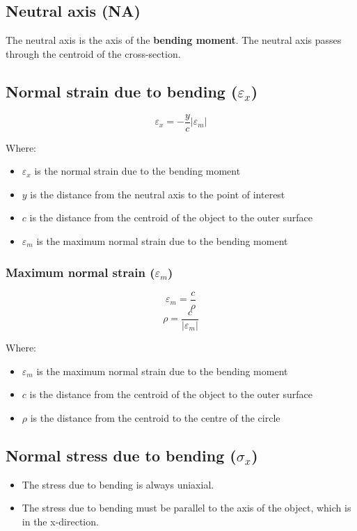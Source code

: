 \documentclass[11pt]{article}
\begin{document}
\subsection{Neutral axis (NA)}
\label{sec:org1c560bc}
The neutral axis is the axis of the \textbf{bending moment}. The neutral axis passes through the centroid of the cross-section.
\subsection{Normal strain due to bending (\(\varepsilon_x\))}
\label{sec:org7c1be3c}
\[\varepsilon_x = - \frac{y}{c} \left| \varepsilon_m \right|\]

Where:
\begin{itemize}
\item \(\varepsilon_x\) is the normal strain due to the bending moment
\item \(y\) is the distance from the neutral axis to the point of interest
\item \(c\) is the distance from the centroid of the object to the outer surface
\item \(\varepsilon_m\) is the maximum normal strain due to the bending moment
\end{itemize}
\subsubsection{Maximum normal strain (\(\varepsilon_m\))}
\label{sec:org68b8147}
\[\varepsilon_m = \frac{c}{\rho}\]
\[\rho = \frac{c}{\left| \varepsilon_m \right|}\]

Where:
\begin{itemize}
\item \(\varepsilon_m\) is the maximum normal strain due to the bending moment
\item \(c\) is the distance from the centroid of the object to the outer surface
\item \(\rho\) is the distance from the centroid to the centre of the circle
\end{itemize}

\newpage
\subsection{Normal stress due to bending (\(\sigma_x\))}
\label{sec:org33f8b43}
\begin{itemize}
\item The stress due to bending is always uniaxial.
\item The stress due to bending must be parallel to the axis of the object, which is in the x-direction.
\end{itemize}
\end{document}
